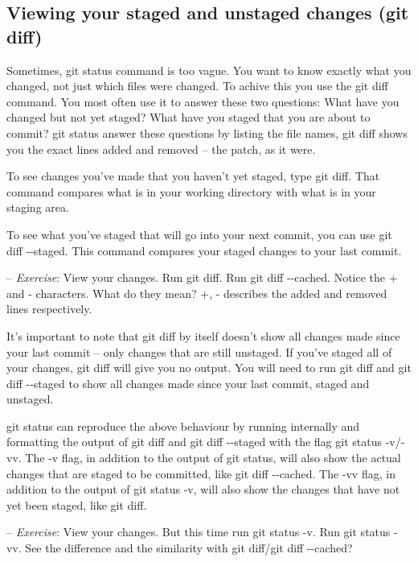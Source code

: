 \documentclass[12pt,a4]{article}
\newcommand{\ilcode}[1]{\textcolor[RGB]{160, 110, 220}{#1}}
\begin{document}
\subsection{Viewing your staged and unstaged changes (git diff)}
Sometimes, \ilcode{git status} command is too vague. You want to know exactly
what you changed, not just which files were changed. To achive this you use the
\ilcode{git diff} command. You most often use it to answer these two questions:
What have you changed but not yet staged? What have you staged that you are
about to commit? \ilcode{git status} answer these questions by listing the file
names, \ilcode{git diff} shows you the exact lines added and removed -- the
patch, as it were.

To see changes you've made that you haven't yet staged, type \ilcode{git diff}.
That command compares what is in your working directory with what is in your
staging area.

To see what you’ve staged that will go into your next commit, you can use
\ilcode{git diff -{}-staged}. This command compares your staged changes to your
last commit.

{\sf -- \emph{Exercise}:} View your changes. Run \ilcode{git diff}. Run
\ilcode{git diff -{}-cached}. Notice the + and - characters. What do they mean?
+, - describes the added and removed lines respectively.

It’s important to note that \ilcode{git diff} by itself doesn’t show all changes
made since your last commit -- only changes that are still unstaged. If you’ve
staged all of your changes, \ilcode{git diff} will give you no output. You will
need to run \ilcode{git diff} and \ilcode{git diff -{}-staged} to show all changes
made since your last commit, staged and unstaged.

\ilcode{git status} can reproduce the above behaviour by running internally and
formatting the output of \ilcode{git diff} and \ilcode{git diff -{}-staged} with
the flag \ilcode{git status -v}/\ilcode{-vv}. The \ilcode{-v} flag, in addition
to the output of \ilcode{git status}, will also show the actual changes that are
staged to be committed, like \ilcode{git diff -{}-cached}. The \ilcode{-vv}
flag, in addition to the output of \ilcode{git status -v}, will also show the
changes that have not yet been staged, like \ilcode{git diff}.

{\sf -- \emph{Exercise}:} View your changes. But this time run \ilcode{git
status -v}. Run \ilcode{git status -vv}. See the difference and the similarity
with \ilcode{git diff}/\ilcode{git diff -{}-cached}?
\end{document}
